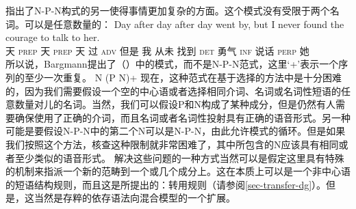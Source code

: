 %
 \citet{Bargmann2015a}指出了N-P-N构式的另一使得事情更加复杂的方面。这个模式没有受限于两个名词。可以是任意数量的：
\ea
\gll Day after day after day went by, but I never found the courage to talk to her.\\
天 \textsc{prep} 天 \textsc{prep} 天 过 \textsc{adv} 但是 我 从未 找到 \textsc{det} 勇气 \textsc{inf} 说话 \textsc{perp} 她\\
\z
所以说，Bargmann提出了（）中的模式，而不是N-P-N范式，这里`+'\isc{$+$}\is{$+$}表示一个序列的至少一次重复。
\ea
\label{n-p-n-plus-cx}
N (P N)+
\z
现在，这种范式在基于选择的方法中是十分困难的，因为我们需要假设一个空的中心语或者选择相同介词、名词或名词性短语的任意数量对儿的名词。当然，我们可以假设P和N构成了某种成分，但是仍然有人需要确保使用了正确的介词，而且名词或者名词性投射具有正确的语音形式。另一种可能是要假设N-P-N中的第二个N可以是N-P-N，由此允许模式的循环。但是如果我们按照这个方法，核查这种限制就非常困难了，其中所包含的N应该具有相同或者至少类似的语音形式。
%
解决这些问题的一种方式当然可以是假定这里具有特殊的机制来指派一个新的范畴到一个或几个成分上。这在本质上可以是一个非中心语的短语结构规则，而且这是\tes 所提出的：转用规则（请参阅\ref{sec-transfer-dg}）。但是，这当然是存粹的依存语法向混合模型的一个扩展。
